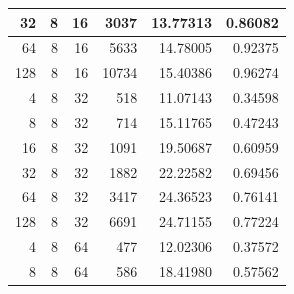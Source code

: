 \documentclass[journal,transmag]{IEEEtran}
\begin{document}
\begin{table}[h]
\begin{tabular}{|r|r|r|r|r|r|}
		32                            & 8                          & 16                               & 3037                           & 13.77313                      & 0.86082                         \\ \hline
		64                            & 8                          & 16                               & 5633                           & 14.78005                      & 0.92375                         \\ \hline
		128                           & 8                          & 16                               & 10734                          & 15.40386                      & 0.96274                         \\ \hline
		4                             & 8                          & 32                               & 518                            & 11.07143                      & 0.34598                         \\ \hline
		8                             & 8                          & 32                               & 714                            & 15.11765                      & 0.47243                         \\ \hline
		16                            & 8                          & 32                               & 1091                           & 19.50687                      & 0.60959                         \\ \hline
		32                            & 8                          & 32                               & 1882                           & 22.22582                      & 0.69456                         \\ \hline
		64                            & 8                          & 32                               & 3417                           & 24.36523                      & 0.76141                         \\ \hline
		128                           & 8                          & 32                               & 6691                           & 24.71155                      & 0.77224                         \\ \hline
		4                             & 8                          & 64                               & 477                            & 12.02306                      & 0.37572                         \\ \hline
		8                             & 8                          & 64                               & 586                            & 18.41980                      & 0.57562                         \\ \hline

\end{tabular}
\end{table}
\end{document}
